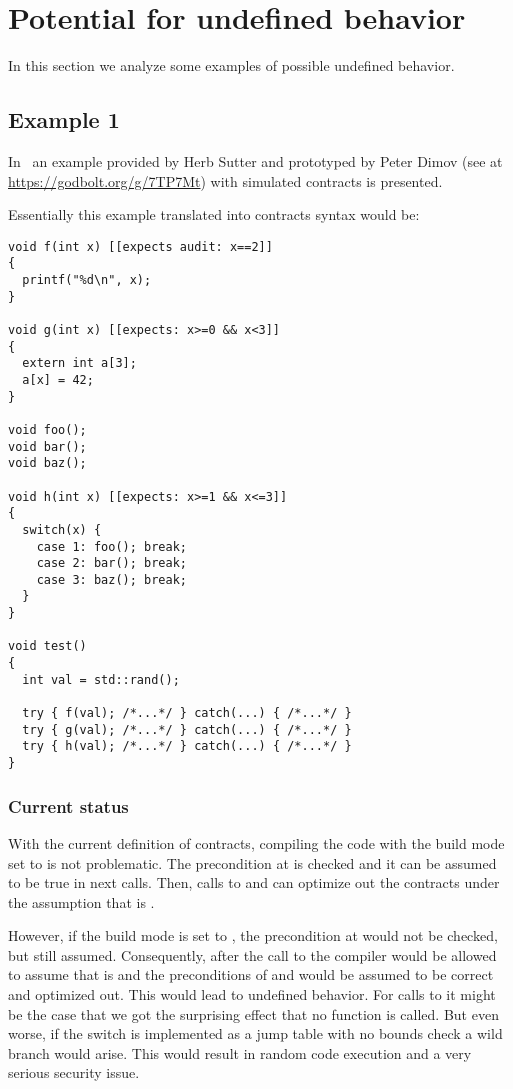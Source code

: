 \section{Potential for undefined behavior}

In this section we analyze some examples of possible undefined behavior.

\subsection{Example 1}

In~\cite{p1321r0} an example provided by Herb Sutter and
prototyped by Peter Dimov (see at
\url{https://godbolt.org/g/7TP7Mt}) with simulated contracts 
is presented.

Essentially this example translated into contracts syntax would be:

\begin{lstlisting}
void f(int x) [[expects audit: x==2]]
{
  printf("%d\n", x);
}

void g(int x) [[expects: x>=0 && x<3]]
{
  extern int a[3];
  a[x] = 42;
}

void foo();
void bar();
void baz();

void h(int x) [[expects: x>=1 && x<=3]]
{
  switch(x) {
    case 1: foo(); break;
    case 2: bar(); break;
    case 3: baz(); break;
  }
}

void test()
{
  int val = std::rand();

  try { f(val); /*...*/ } catch(...) { /*...*/ }
  try { g(val); /*...*/ } catch(...) { /*...*/ }
  try { h(val); /*...*/ } catch(...) { /*...*/ }
}
\end{lstlisting}

\subsubsection{Current status}

With the current definition of contracts, compiling the code with the build mode
set to  is not problematic. The precondition at  is
checked and it can be assumed to be true in next calls. Then, calls to 
and  can optimize out the contracts under the assumption that
 is . 

However, if the build mode is set to , the precondition at
 would not be checked, but still assumed.  Consequently, after the
call to  the compiler would be allowed to assume that 
is  and the preconditions of  and  would be
assumed to be correct and optimized out.  This would lead to undefined behavior.
For calls to  it might be the case that we got the surprising effect
that no function is called. But even worse, if the switch is implemented as
a jump table with no bounds check a wild branch would arise. This would
result in random code execution and a very serious security issue.

